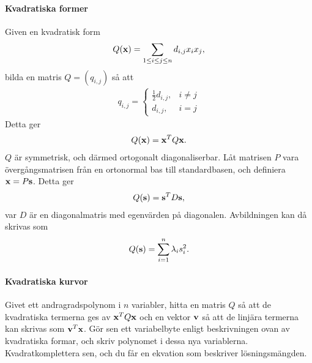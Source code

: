 \paragraph{Kvadratiska former}
Given en kvadratisk form
\begin{align*}
	Q(\vect{x}) = \sum\limits_{1\leq i\leq j\leq n}d_{i, j}x_ix_j,
\end{align*}
bilda en matris $Q = (q_{i, j})$ så att
\begin{align*}
	q_{i, j} =
	\begin{cases}
		\frac{1}{2}d_{i, j}, &i\neq j\\
		d_{i, j},            &i = j
	\end{cases}
\end{align*}
Detta ger
\begin{align*}
	Q(\vect{x}) = \vect{x}^TQ\vect{x}.
\end{align*}
$Q$ är symmetrisk, och därmed ortogonalt diagonaliserbar. Låt matrisen $P$ vara övergångsmatrisen från en ortonormal bas till standardbasen, och definiera $\vect{x} = P\vect{s}$. Detta ger
\begin{align*}
	Q(\vect{s}) = \vect{s}^TD\vect{s},
\end{align*}
var $D$ är en diagonalmatris med egenvärden på diagonalen. Avbildningen kan då skrivas som
\begin{align*}
	Q(\vect{s}) = \sum\limits_{i = 1}^{n}\lambda_is_i^2.
\end{align*}

\paragraph{Kvadratiska kurvor}
Givet ett andragradspolynom i $n$ variabler, hitta en matris $Q$ så att de kvadratiska termerna ges av $\vect{x}^TQ\vect{x}$ och en vektor $\vect{v}$ så att de linjära termerna kan skrivas som $\vect{v}^T\vect{x}$. Gör sen ett variabelbyte enligt beskrivningen ovan av kvadratiska formar, och skriv polynomet i dessa nya variablerna. Kvadratkomplettera sen, och du får en ekvation som beskriver lösningsmängden.